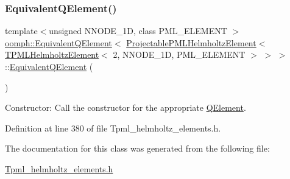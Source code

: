 \subsubsection{\texorpdfstring{Equivalent\+Q\+Element()}{EquivalentQElement()}}
{\footnotesize\ttfamily template$<$unsigned N\+N\+O\+D\+E\+\_\+1D, class P\+M\+L\+\_\+\+E\+L\+E\+M\+E\+NT $>$ \\
\hyperlink{classoomph_1_1EquivalentQElement}{oomph\+::\+Equivalent\+Q\+Element}$<$ \hyperlink{classoomph_1_1ProjectablePMLHelmholtzElement}{Projectable\+P\+M\+L\+Helmholtz\+Element}$<$ \hyperlink{classoomph_1_1TPMLHelmholtzElement}{T\+P\+M\+L\+Helmholtz\+Element}$<$ 2, N\+N\+O\+D\+E\+\_\+1D, P\+M\+L\+\_\+\+E\+L\+E\+M\+E\+NT $>$ $>$ $>$\+::\hyperlink{classoomph_1_1EquivalentQElement}{Equivalent\+Q\+Element} (\begin{DoxyParamCaption}{ }\end{DoxyParamCaption})\hspace{0.3cm}{\ttfamily [inline]}}



Constructor\+: Call the constructor for the appropriate \hyperlink{classoomph_1_1QElement}{Q\+Element}. 



Definition at line 380 of file Tpml\+\_\+helmholtz\+\_\+elements.\+h.



The documentation for this class was generated from the following file\+:\begin{DoxyCompactItemize}
\item 
\hyperlink{Tpml__helmholtz__elements_8h}{Tpml\+\_\+helmholtz\+\_\+elements.\+h}\end{DoxyCompactItemize}
